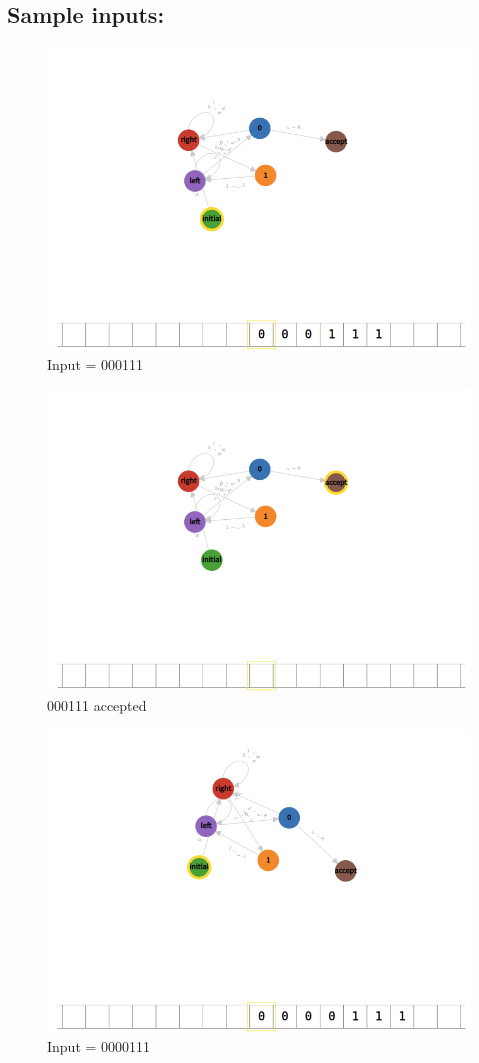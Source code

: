 \documentclass[12pt]{article}
\begin{document}
\subsection*{Sample inputs:}
\begin{figure}[H]
    \caption{Input = 000111}
    \centering
    \includegraphics[width=12cm]{Q1/000111.png}    
\end{figure}
\begin{figure}[H]
    \caption{000111 accepted}
    \centering
    \includegraphics[width=12cm]{Q1/000111o.png}    
\end{figure}
\begin{figure}[H]
    \caption{Input = 0000111}
    \centering
    \includegraphics[width=12cm]{Q1/0000111.png}    
\end{figure}
\end{document}
